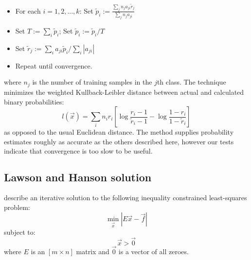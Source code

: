 \documentclass{article}
\newenvironment{eqnnon}{\begin{equation*}}{\end{equation*}}
\begin{document}
\begin{itemize}
	\item For each $i=1, 2, ..., k$:
			Set $\tilde p_i := \frac{\sum_j n_j a_{ji} \tilde r_j}{\sum_j n_j a_{ji}}$
	\item Set $T := \sum_i \tilde p_i$; Set $\tilde p_i := \tilde p_i/T$
	\item Set $\tilde r_j := \sum_i a_{ji} \tilde p_i/\sum_i |a_{ji}|$
	\item Repeat until convergence.
\end{itemize}
where $n_j$ is the number of training samples in the $j$th class.
The technique minimizes the weighted Kullback-Leibler distance between actual and calculated
binary probabilities:
\begin{eqnnon}
	l(\vec x) = \sum_{i} n_i r_i \left [ \log \frac{r_i-1}{\tilde r_i-1} - \log \frac{1-r_i}{1-\tilde r_i} \right ]
\end{eqnnon}
as opposed to the usual Euclidean distance.
The method supplies probability estimates roughly as accurate as the others described here,
however our tests indicate that convergence is too slow to be useful.

\subsection{Lawson and Hanson solution}

\label{Lawson_Hanson}

\citet{Lawson_Hanson1995} describe an iterative solution to the following
inequality constrained least-squares problem:
\begin{eqnnon}
	\min_{\vec x} | E \vec x - \vec f |
\end{eqnnon}
subject to:
\begin{eqnnon}
	\vec x > \vec 0
\end{eqnnon}
where $E$ is an $[m \times n]$ matrix
and $\vec 0$ is a vector of all zeroes.
\end{document}
